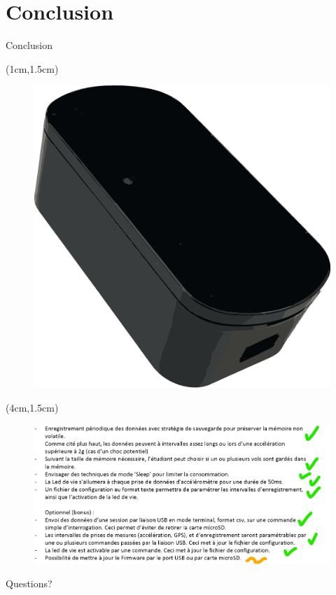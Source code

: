 \documentclass{beamer}
\begin{document}
\section{Conclusion}
\begin{frame}{Conclusion}
	
\begin{textblock*}{3cm}(1cm,1.5cm) %
	\begin{figure}[h]
		\centering
		\includegraphics[width=1\linewidth]{../figures/boite-noire}
	\end{figure}
\end{textblock*}

\begin{textblock*}{9cm}(4cm,1.5cm) %
	\begin{figure}[h]
		\centering
		\includegraphics[width=1\linewidth]{../figures/presentation/CDC.pdf}
	\end{figure}		
\end{textblock*}
\end{frame}

\begin{frame}[standout]
	Questions?
\end{frame}
	
\end{document}
